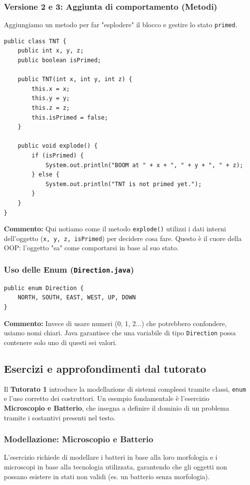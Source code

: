 \documentclass[12pt, a4paper]{article}
\begin{document}
\newpage

\subsubsection{Versione 2 e 3: Aggiunta di comportamento (Metodi)}
Aggiungiamo un metodo per far "esplodere" il blocco e gestire lo stato \texttt{primed}.

\begin{verbatim}
public class TNT {
    public int x, y, z;
    public boolean isPrimed;

    public TNT(int x, int y, int z) {
        this.x = x;
        this.y = y;
        this.z = z;
        this.isPrimed = false;
    }

    public void explode() {
        if (isPrimed) {
            System.out.println("BOOM at " + x + ", " + y + ", " + z);
        } else {
            System.out.println("TNT is not primed yet.");
        }
    }
}
\end{verbatim}
\textbf{Commento:} Qui notiamo come il metodo \texttt{explode()} utilizzi i dati interni dell'oggetto (\texttt{x, y, z, isPrimed}) per decidere cosa fare. Questo è il cuore della OOP: l'oggetto "sa" come comportarsi in base al suo stato.

\subsubsection{Uso delle Enum (\texttt{Direction.java})}
\begin{verbatim}
public enum Direction {
    NORTH, SOUTH, EAST, WEST, UP, DOWN
}
\end{verbatim}
\textbf{Commento:} Invece di usare numeri (0, 1, 2...) che potrebbero confondere, usiamo nomi chiari. Java garantisce che una variabile di tipo \texttt{Direction} possa contenere solo uno di questi sei valori.

\subsection{Esercizi e approfondimenti dal tutorato}
Il \textbf{Tutorato 1} introduce la modellazione di sistemi complessi tramite classi, \texttt{enum} e l'uso corretto dei costruttori. Un esempio fondamentale è l'esercizio \textbf{Microscopio e Batterio}, che insegna a definire il dominio di un problema tramite i sostantivi presenti nel testo.

\subsubsection{Modellazione: Microscopio e Batterio}
L'esercizio richiede di modellare i batteri in base alla loro morfologia e i microscopi in base alla tecnologia utilizzata, garantendo che gli oggetti non possano esistere in stati non validi (es. un batterio senza morfologia).
\end{document}
